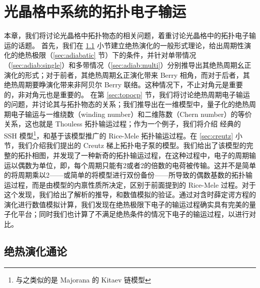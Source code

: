 \chapter{光晶格中系统的拓扑电子输运} \label{chap:chargepump}

本章，我们将讨论光晶格中拓扑物态的相关问题，着重讨论光晶格中的拓扑电子输运的话题。
首先，我们在 \ref{sec:adiabevolgeneral} 小节建立绝热演化的一般形式理论，给出周期性演化的绝热极限（\ref{sec:adiabatic} 节）下的条件，并针对单带情况（\ref{sec:adiab:single}）和多带情况（\ref{sec:adiab:multi}）分别推导出其绝热周期幺正演化的形式；对于前者，其绝热周期幺正演化带来 Berry 相角，而对于后者，其绝热周期要睁演化带来非阿贝尔 Berry 联络。这种情况下，不止对角元是重要的，非对角元也是重要的。
在第 \ref{sec:topocp} 节，我们将讨论绝热周期电子输运的问题，并讨论其与拓扑物态的关系；我们推导出在一维模型中，量子化的绝热周期电子输运与一维绕数（winding number）和二维陈数（Chern number）的等价关系，这也就是 Thouless 拓扑输运过程\cite{thouless1983}；作为一个例子，我们将介绍 经典的 SSH 模型\cite{ssh1979}\footnote{与之类似的是 Majorana 的 Kitaev 链模型\cite{kitaev2001}}，和基于该模型推广的 Rice-Mele 拓扑输运过程\cite{ricemele1982}。在 \ref{sec:creutz} 小节，我们介绍我们提出的 Creutz 梯\cite{creutz1999}上拓扑电子泵的模型\cite{creutz}。我们给出了该模型的完整的拓扑相图，并发现了一种新奇的拓扑输运过程，在这种过程中，电子的周期输运以偶数为单位，即，每个周期只能有2或者2的倍数的电荷被传输。这并不是简单的将周期乘以2——或简单的将模型进行双份备份——所导致的偶数基数的拓扑输运过程，而是由模型的内禀性质所决定，区别于前面提到的 Rice-Mele 过程。对于这个发现，我们给出了解析的推导，和数值模拟的验证。通过对含时薛定谔方程的演化进行数值模拟计算，我们发现在绝热极限下电子的输运过程确实具有完美的量子化平台；同时我们也计算了不满足绝热条件的情况下电子的输运过程，以进行对比。





\section{绝热演化通论}\label{sec:adiabevolgeneral}

